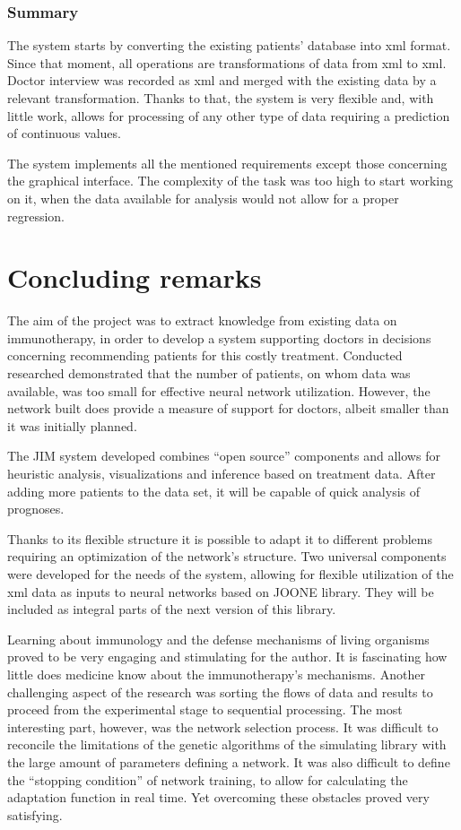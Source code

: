 \documentclass[10pt,oneside]{memoir}
\begin{document}
\section{Summary}
\label{summary}

The system starts by converting the existing patients' database into xml format. Since that moment, all operations are transformations of data from xml to xml. Doctor interview was recorded as xml and merged with the existing data by a relevant transformation. Thanks to that, the system is very flexible and, with little work, allows for processing of any other type of data requiring a prediction of continuous values.


The system implements all the mentioned requirements except those concerning the graphical interface. The complexity of the task was too high to start working on it, when the data available for analysis would not allow for a proper regression.


\part{Concluding remarks}
\label{chapter7}

The aim of the project was to extract knowledge from existing data on immunotherapy, in order to develop a system supporting doctors in decisions concerning recommending patients for this costly treatment. Conducted researched demonstrated that the number of patients, on whom data was available, was too small for effective neural network utilization. However, the network built does provide a measure of support for doctors, albeit smaller than it was initially planned.


The JIM system developed combines ``open source'' components and allows for heuristic analysis, visualizations and inference based on treatment data. After adding more patients to the data set, it will be capable of quick analysis of prognoses.


Thanks to its flexible structure it is possible to adapt it to different problems requiring an optimization of the network's structure.
Two universal components were developed for the needs of the system, allowing for flexible utilization of the xml data as inputs to neural networks based on JOONE library. They will be included as integral parts of the next version of this library.


Learning about immunology and the defense mechanisms of living organisms proved to be very engaging and stimulating for the author. It is fascinating how little does medicine know about the immunotherapy's mechanisms. Another challenging aspect of the research was sorting the flows of data and results to proceed from the experimental stage to sequential processing. The most interesting part, however, was the network selection process. It was difficult to reconcile the limitations of the genetic algorithms of the simulating library with the large amount of parameters defining a network. It was also difficult to define the ``stopping condition'' of network training, to allow for calculating the adaptation function in real time. Yet overcoming these obstacles proved very satisfying.
\end{document}
